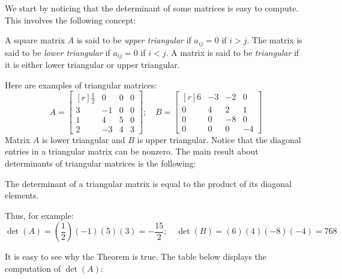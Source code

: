 \documentclass[12pt]{article}
\begin{document}
We start by noticing that the determinant of some matrices is easy to compute. This involves the following concept:

\begin{definition} A square matrix $A$ is said to be \emph{upper triangular} if $a_{ij}=0$ if $i>j$. The matrix is said to be \emph{lower triangular} if $a_{ij}=0$ if $i<j$. A matrix is said to be \emph{triangular} if it is either lower triangular or upper triangular.
\end{definition}
Here are examples of triangular matrices:
\[
A=\left[\begin{matrix*}[r]\frac{1}{2} & 0 & 0 & 0\\3 & -1 & 0 & 0\\1 & 4 & 5 & 0\\2 & -3 & 4 & 3\end{matrix*}\right];\quad
B=\left[\begin{matrix*}[r]6 & -3 & -2 & 0\\0 & 4 & 2 & 1\\0 & 0 & -8 & 0\\0 & 0 & 0 & -4\end{matrix*}\right]
\]
Matrix $A$ is lower triangular and $B$ is upper triangular. Notice that the diagonal entries in a triangular matrix can be nonzero. The main result about determinants of triangular matrices is the following:

\begin{theorem}The determinant of a triangular matrix is equal to the product of its diagonal elements.
\end{theorem}

Thus, for example:
\[
\det(A)=\left(\frac{1}{2}\right)(-1)(5)(3)=-\frac{15}{2};\quad\det(B)=(6)(4)(-8)(-4)=768
\]

It is easy to see why the Theorem is true. The table below displays the computation of $\det(A)$:
\end{document}
